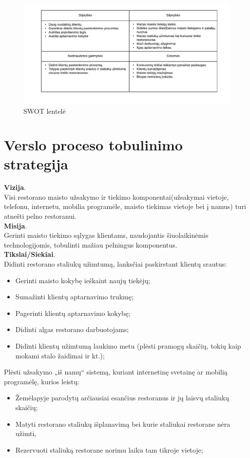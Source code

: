 \documentclass{VUMIFPSkursinis}
\begin{document}
	\begin {figure}[H]
	\centering
		
		\includegraphics[scale=1]{img/3lab/Diagrama9}
		\caption{SWOT lentelė}
		\label{fig:diagrama9}
	\end{figure}

\section{Verslo proceso tobulinimo strategija}
\noindent \textbf{Vizija}.\\
Visi restorano maisto užsakymo ir tiekimo komponentai(užsakymai vietoje, telefonu, internetu, mobilia programėle, maisto tiekimas vietoje bei į namus) turi atnešti pelno restoranui.\\
\textbf{Misija}.\\
Gerinti maisto tiekimo sąlygas klientams, naudojantis šiuolaikinėmis technologijomis, tobulinti mažiau pelningus komponentus.\\
\textbf{Tikslai/Siekiai}.\\
Didinti restorano staliukų užimtumą, lanksčiai paskirstant klientų srautus:
	\begin{itemize}
	\item Gerinti maisto kokybę ieškaint naujų tiekėjų;
	\item Sumažinti klientų aptarnavimo trukmę;
	\item Pagerinti klientų aptarnavimo kokybę;
	\item Didinti algas restorano darbuotojams;
	\item Didinti klientų užimtumą laukimo metu (plėsti pramogų skaičių, tokių kaip mokami stalo žaidimai ir kt.);
	\end{itemize}
Plėsti užsakymo „iš namų“ sistemą, kuriant internetinę svetainę ar mobilią programėlę, kurios leistų:
	\begin{itemize}
	\item Žemėlapyje parodytų arčiausiai esančius restoranus ir jų laisvų staliukų skaičių;
	\item Matyti restorano staliukų išplanavimą bei kurie staliukai restorane nėra užimti,
	\item Rezervuoti staliuką restorane norimu laiku tam tikroje vietoje;
	\end{itemize}
\end{document}
